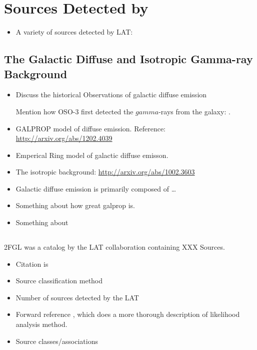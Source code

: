 
\section{Sources Detected by }

\begin{itemize}
  \item A variety of sources detected by \ac{LAT}:
\end{itemize}

\subsection{The Galactic Diffuse and Isotropic Gamma-ray Background}


\begin{itemize}
  \item Discuss the historical Observations of galactic diffuse emission

    Mention how \gls{OSO-3} first detected the $gamma$-rays from the galaxy: .

  \item GALPROP model of diffuse emission.
  Reference: \url{http://arxiv.org/abs/1202.4039}
  \item Emperical Ring model of galactic diffuse emisson.
  \item The isotropic background: \url{http://arxiv.org/abs/1002.3603}
\end{itemize}

\begin{itemize}
  \item Galactic diffuse emission is primarily composed of \ldots
  \item Something about how great galprop is.
  \item Something about
\end{itemize}


\subsection{}

\Gls{2FGL} was a catalog by the \ac{LAT} collaboration containing XXX Sources.

\begin{itemize}
  \item Citation is \cite{nolan_2012_fermi-large}
  \item Source classification method
  \item Number of sources detected by the \gls{LAT}
  \item Forward reference ,
    which does a more thorough description of likelihood analysis method.
  \item Source classes/associations
\end{itemize}

